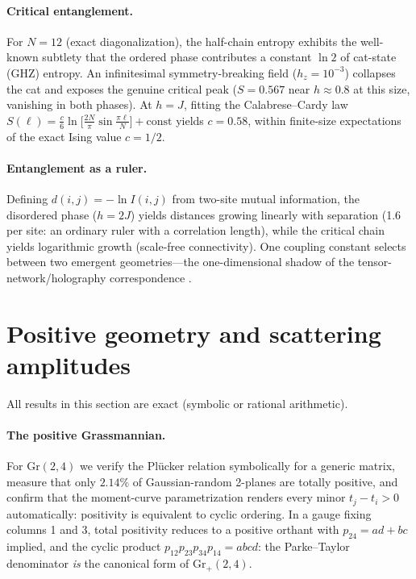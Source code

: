 \documentclass[11pt]{article}
\begin{document}
\paragraph{Critical entanglement.} For $N = 12$ (exact
diagonalization), the half-chain entropy exhibits the well-known
subtlety that the ordered phase contributes a constant $\ln 2$ of
cat-state (GHZ) entropy. An infinitesimal symmetry-breaking field
($h_z = 10^{-3}$) collapses the cat and exposes the genuine critical
peak ($S = 0.567$ near $h \approx 0.8$ at this size, vanishing in both
phases). At $h = J$, fitting the Calabrese--Cardy law
$S(\ell) = \tfrac{c}{6}\ln\!\big[\tfrac{2N}{\pi}\sin\tfrac{\pi\ell}{N}\big]
+ \text{const}$ yields $c = 0.58$, within finite-size expectations of
the exact Ising value $c = 1/2$.

\paragraph{Entanglement as a ruler.} Defining
$d(i,j) = -\ln I(i,j)$ from two-site mutual information, the disordered
phase ($h = 2J$) yields distances growing linearly with separation
(1.6 per site: an ordinary ruler with a correlation length), while the
critical chain yields logarithmic growth (scale-free connectivity). One
coupling constant selects between two emergent geometries---the
one-dimensional shadow of the tensor-network/holography correspondence
\citep{Swingle:2009bg,Czech:2015qta}.

\section{Positive geometry and scattering amplitudes}
\label{sec:positive}

All results in this section are exact (symbolic or rational arithmetic).

\paragraph{The positive Grassmannian.} For $\mathrm{Gr}(2,4)$ we verify
the Pl\"ucker relation symbolically for a generic matrix, measure that
only $2.14\%$ of Gaussian-random 2-planes are totally positive, and
confirm that the moment-curve parametrization renders every minor
$t_j - t_i > 0$ automatically: positivity is equivalent to cyclic
ordering. In a gauge fixing columns 1 and 3, total positivity reduces to
a positive orthant with $p_{24} = ad + bc$ implied, and the cyclic
product $p_{12}p_{23}p_{34}p_{14} = abcd$: the Parke--Taylor denominator
\emph{is} the canonical form of $\mathrm{Gr}_{+}(2,4)$.
\end{document}
